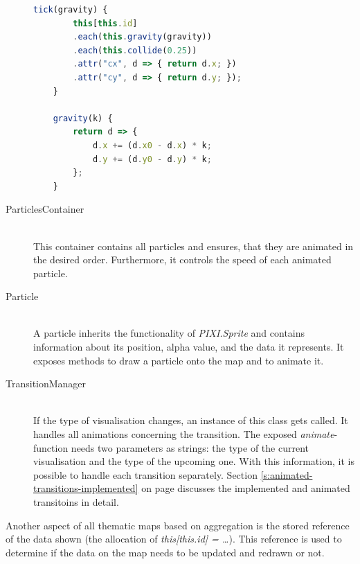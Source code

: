 \begin{description}
\begin{lstlisting}[language=JavaScript, caption={A small part of the draw-function of the pseudo Demers Cartogramm-class}, label={lst:cartogram-part-tick}]
    tick(gravity) {
        this[this.id]
        .each(this.gravity(gravity))
        .each(this.collide(0.25))
        .attr("cx", d => { return d.x; })
        .attr("cy", d => { return d.y; });
    }

    gravity(k) {
        return d => {
            d.x += (d.x0 - d.x) * k;
            d.y += (d.y0 - d.y) * k;
        };
    }
\end{lstlisting}

\item[ParticlesContainer] \hfill \\
This container contains all particles and ensures, that they are animated in the desired order. Furthermore, it controls the speed of each animated particle.

\item[Particle] \hfill \\
A particle inherits the functionality of \textit{PIXI.Sprite} and contains information about its position, alpha value, and the data it represents. It exposes methods to draw a particle onto the map and to animate it.

\item[TransitionManager] \hfill \\
If the type of visualisation changes, an instance of this class gets called. It handles all animations concerning the transition. The exposed \textit{animate}-function needs two parameters as strings: the type of the current visualisation and the type of the upcoming one. With this information, it is possible to handle each transition separately. Section \ref{s:animated-transitions-implemented} on page \pageref{s:animated-transitions-implemented} discusses the implemented and animated transitoins in detail.
\end{description}

Another aspect of all thematic maps based on aggregation is the stored reference of the data shown (the allocation of \textit{this[this.id] = \ldots}). This reference is used to determine if the data on the map needs to be updated and redrawn or not.
